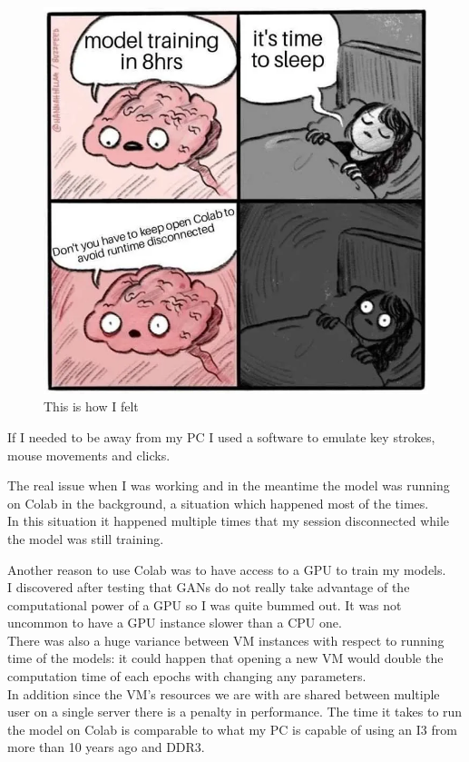 \documentclass[
  letterpaper,
  DIV=11,
  numbers=noendperiod]{scrreprt}
\begin{document}
\begin{figure}

{\centering \includegraphics{colab_sleep.webp}

}

\caption{This is how I felt}

\end{figure}

If I needed to be away from my PC I used a software to emulate key
strokes, mouse movements and clicks.

The real issue when I was working and in the meantime the model was
running on Colab in the background, a situation which happened most of
the times.\\
In this situation it happened multiple times that my session
disconnected while the model was still training.

Another reason to use Colab was to have access to a GPU to train my
models.\\
I discovered after testing that GANs do not really take advantage of the
computational power of a GPU so I was quite bummed out. It was not
uncommon to have a GPU instance slower than a CPU one.\\
There was also a huge variance between VM instances with respect to
running time of the models: it could happen that opening a new VM would
double the computation time of each epochs with changing any
parameters.\\
In addition since the VM's resources we are with are shared between
multiple user on a single server there is a penalty in performance. The
time it takes to run the model on Colab is comparable to what my PC is
capable of using an I3 from more than 10 years ago and DDR3.
\end{document}
